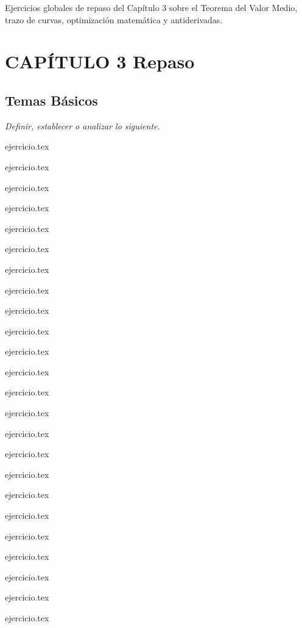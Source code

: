 
Ejercicios globales de repaso del Capítulo 3 sobre el Teorema del Valor Medio, trazo de curvas, optimización matemática y antiderivadas.

\section*{CAPÍTULO 3 \quad Repaso}

\subsection*{Temas Básicos}

\noindent \textit{Definir, establecer o analizar lo siguiente.}
\begin{enumerate}
    \begin{minipage}{0.45\textwidth}
    {ejercicio.tex}
    \addtocounter{enumi}{1}
    {ejercicio.tex}
    \addtocounter{enumi}{1}
    {ejercicio.tex}
    \addtocounter{enumi}{1}
    {ejercicio.tex}
    \addtocounter{enumi}{1}
    {ejercicio.tex}
    \addtocounter{enumi}{1}
    {ejercicio.tex}
    \addtocounter{enumi}{1}
    {ejercicio.tex}
    \addtocounter{enumi}{1}
    {ejercicio.tex}
    \addtocounter{enumi}{1}
    {ejercicio.tex}
    \addtocounter{enumi}{1}
    {ejercicio.tex}
    \addtocounter{enumi}{1}
    {ejercicio.tex}
    \addtocounter{enumi}{1}
    {ejercicio.tex}
    \end{minipage}%
    \begin{minipage}{0.45\textwidth}
    \setcounter{enumi}{1}
    {ejercicio.tex}
    \addtocounter{enumi}{1}
    {ejercicio.tex}
    \addtocounter{enumi}{1}
    {ejercicio.tex}
    \addtocounter{enumi}{1}
    {ejercicio.tex}
    \addtocounter{enumi}{1}
    {ejercicio.tex}
    \addtocounter{enumi}{1}
    {ejercicio.tex}
    \addtocounter{enumi}{1}
    {ejercicio.tex}
    \addtocounter{enumi}{1}
    {ejercicio.tex}
    \addtocounter{enumi}{1}
    {ejercicio.tex}
    \addtocounter{enumi}{1}
    {ejercicio.tex}
    \addtocounter{enumi}{1}
    {ejercicio.tex}
    \addtocounter{enumi}{1}
    {ejercicio.tex}
    \end{minipage}
\end{enumerate}

